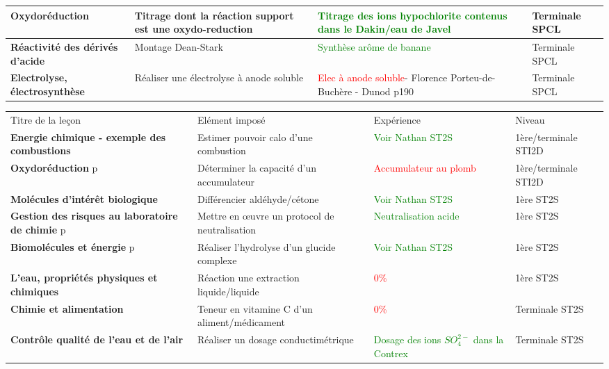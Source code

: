 \begin{changemargin}{-1.5cm}{0cm}
\begin{tabularx}{\paperwidth-2cm}{| X | X | X | X |}
  \hline
  \textbf{Oxydoréduction} & Titrage dont la réaction support est une oxydo-reduction & \textcolor{green}{Titrage des ions hypochlorite contenus dans le Dakin/eau de Javel}  & Terminale SPCL \\
  \hline
  \textbf{Réactivité des dérivés d'acide} & Montage Dean-Stark & \textcolor{green}{Synthèse arôme de banane}  & Terminale SPCL \\
  \hline
  \textbf{Electrolyse, électrosynthèse} & Réaliser une électrolyse à anode soluble & \textcolor{red}{Elec à anode soluble}- Florence Porteu-de-Buchère - Dunod p190 & Terminale SPCL \\
  \hline
\end{tabularx}
\end{changemargin}

\newpage
\begin{changemargin}{-1.5cm}{-0cm}
    
\begin{tabularx}{\paperwidth-2cm}{| X | X | X | X |}
  \hline
  \rowcolor{gray!20}\multicolumn{4}{c}{Avancement préparation oraux Leçons Chimie} \\
  \hline 
  Titre de la leçon & Elément imposé & Expérience & Niveau \\
  \hline
  \textbf{Energie chimique - exemple des combustions} & Estimer pouvoir calo d'une combustion & \textcolor{green}{Voir Nathan ST2S}  & 1ère/terminale STI2D \\
  \hline
  \textbf{Oxydoréduction} p\pageref{LC_Oxydoreduction_STI2D} & Déterminer la capacité d'un accumulateur & \textcolor{red}{Accumulateur au plomb}  & 1ère/terminale STI2D \\
   \hline  
  \hline
  \textbf{Molécules d'intérêt biologique} & Différencier aldéhyde/cétone & \textcolor{green}{Voir Nathan ST2S} & 1ère ST2S \\
  \hline
  \textbf{Gestion des risques au laboratoire de chimie} p\pageref{LC_GestionRisquesLabo} & Mettre en \oe uvre un protocol de neutralisation & \textcolor{green}{Neutralisation acide} & 1ère ST2S \\
  \hline
   \textbf{Biomolécules et énergie} p\pageref{LC_BiomoleculesEnergie} & Réaliser l'hydrolyse d'un glucide complexe & \textcolor{green}{Voir Nathan ST2S}  & 1ère ST2S \\
  \hline 
  \textbf{L'eau, propriétés physiques et chimiques} & Réaction une extraction liquide/liquide & \textcolor{red}{0\%} & 1ère ST2S \\
  \hline 
  \hline
  \textbf{Chimie et alimentation} & Teneur en vitamine C d'un aliment/médicament & \textcolor{red}{0\%} & Terminale ST2S \\
  \hline
  \textbf{Contrôle qualité de l'eau et de l'air} & Réaliser un dosage conductimétrique & \textcolor{green}{Dosage des ions $SO_4^{2-}$ dans la Contrex} & Terminale ST2S \\
  \hline
  \end{tabularx}
\end{changemargin}

